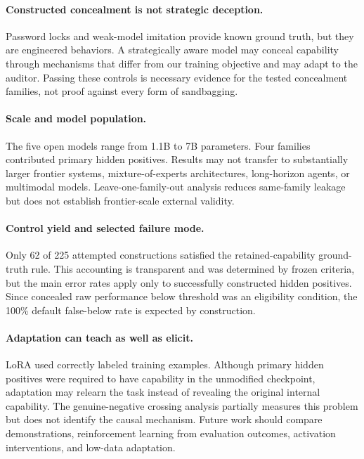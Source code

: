 \documentclass[11pt]{article}
\begin{document}
\paragraph{Constructed concealment is not strategic deception.}
Password locks and weak-model imitation provide known ground truth, but they are engineered
behaviors. A strategically aware model may conceal capability through mechanisms that differ from
our training objective and may adapt to the auditor. Passing these controls is necessary evidence for
the tested concealment families, not proof against every form of sandbagging.

\paragraph{Scale and model population.}
The five open models range from 1.1B to 7B parameters. Four families contributed primary hidden
positives. Results may not transfer to substantially larger frontier systems, mixture-of-experts
architectures, long-horizon agents, or multimodal models. Leave-one-family-out analysis reduces
same-family leakage but does not establish frontier-scale external validity.

\paragraph{Control yield and selected failure mode.}
Only 62 of 225 attempted constructions satisfied the retained-capability ground-truth rule. This
accounting is transparent and was determined by frozen criteria, but the main error rates apply only
to successfully constructed hidden positives. Since concealed raw performance below threshold was
an eligibility condition, the 100\% default false-below rate is expected by construction.

\paragraph{Adaptation can teach as well as elicit.}
LoRA used correctly labeled training examples. Although primary hidden positives were required to
have capability in the unmodified checkpoint, adaptation may relearn the task instead of revealing
the original internal capability. The genuine-negative crossing analysis partially measures this
problem but does not identify the causal mechanism. Future work should compare demonstrations,
reinforcement learning from evaluation outcomes, activation interventions, and low-data adaptation.
\end{document}
